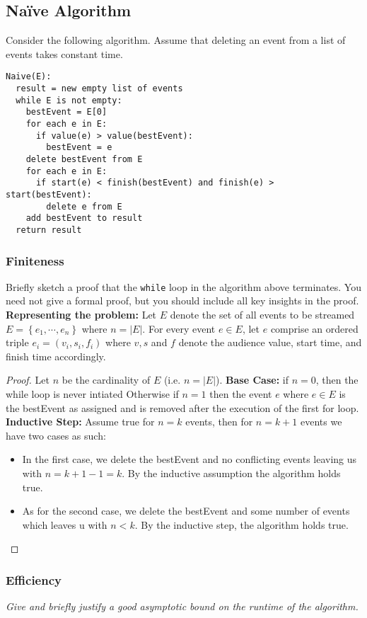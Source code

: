 \documentclass[11pt, oneside]{article}   	%
\theoremstyle{definition}
\theoremstyle{remark}
\begin{document}
\subsection{Na\"ive Algorithm}
Consider the following algorithm. Assume that deleting an event from a
list of events takes constant time.
\begin{verbatim}
Naive(E):
  result = new empty list of events
  while E is not empty:
    bestEvent = E[0]
    for each e in E:
      if value(e) > value(bestEvent):
        bestEvent = e
    delete bestEvent from E
    for each e in E:
      if start(e) < finish(bestEvent) and finish(e) > start(bestEvent):
        delete e from E
    add bestEvent to result
  return result
\end{verbatim}

\subsubsection{Finiteness}
Briefly sketch a proof that the \texttt{while} loop in the algorithm above
terminates. You need not give a formal proof, but you should include
all key insights in the proof.
\textbf{Representing the problem:} Let $E$ denote the set of all events to be streamed $E=\left\{e_1, \dotsm, e_n\right\}$ where $n=|E|.$ For every event $e \in E$, let $e$ comprise an ordered triple $e_i = (v_i, s_i, f_i)$ where $v,s$ and $f$ denote the audience value, start time, and finish time accordingly.

\begin{proof}
Let $n$ be the cardinality of $E$ (i.e. $n=|E|$).
\textbf{Base Case:} if $n = 0$, then the while loop is never intiated
Otherwise if $n=1$ then the event $e$ where $e \in E$ is the bestEvent as assigned and is removed after the execution of the first for loop. 
\textbf{Inductive Step:} Assume true for $n=k$ events, then for $n=k+1$ events we have two cases as such:
\begin{itemize}
	\item In the first case, we delete the bestEvent and no conflicting events leaving us with $n=k+1-1=k$. By the inductive assumption the algorithm holds true.
	\item As for the second case, we delete the bestEvent and some number of events which leaves u with $n<k$. By the inductive step, the algorithm holds true.
\end{itemize} 
\end{proof}

\subsubsection{Efficiency}
\textit{Give and briefly justify a good asymptotic bound on the runtime of the algorithm.}
\end{document}

